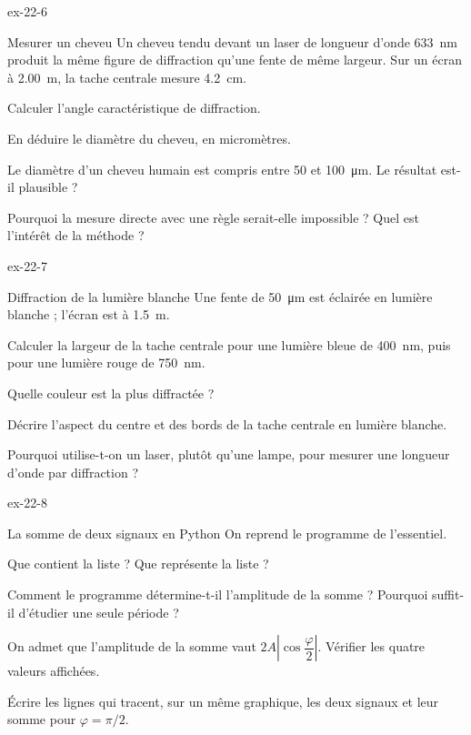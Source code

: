 \begin{blocLivre}{ex-22-6}
\begin{exercice}[2]{Mesurer un cheveu}
Un cheveu tendu devant un laser de longueur d'onde \qty{633}{nm} produit la même figure de diffraction qu'une fente de même
largeur. Sur un écran à \qty{2,00}{m}, la tache centrale mesure \qty{4,2}{cm}.
\begin{questions}
\item Calculer l'angle caractéristique de diffraction.
\item En déduire le diamètre du cheveu, en micromètres.
\item Le diamètre d'un cheveu humain est compris entre 50 et \qty{100}{\micro m}. Le résultat est-il plausible ?
\item Pourquoi la mesure directe avec une règle serait-elle impossible ? Quel est l'intérêt de la méthode ?
\end{questions}
\end{exercice}
\end{blocLivre}
\begin{blocLivre}{ex-22-7}
\begin{exercice}[2]{Diffraction de la lumière blanche}
Une fente de \qty{50}{\micro m} est éclairée en lumière blanche ; l'écran est à \qty{1,5}{m}.
\begin{questions}
\item Calculer la largeur de la tache centrale pour une lumière bleue de \qty{400}{nm}, puis pour une lumière rouge de
\qty{750}{nm}.
\item Quelle couleur est la plus diffractée ?
\item Décrire l'aspect du centre et des bords de la tache centrale en lumière blanche.
\item Pourquoi utilise-t-on un laser, plutôt qu'une lampe, pour mesurer une longueur d'onde par diffraction ?
\end{questions}
\end{exercice}
\end{blocLivre}
\begin{blocLivre}{ex-22-8}
\begin{exercice}[2]{La somme de deux signaux en Python}
On reprend le programme de l'essentiel.
\begin{questions}
\item {}Que contient la liste  ? Que représente la liste  ?
\item Comment le programme détermine-t-il l'amplitude de la somme ? Pourquoi suffit-il d'étudier une seule période ?
\item On admet que l'amplitude de la somme vaut $2A\left|\cos\dfrac{\varphi}{2}\right|$. Vérifier les quatre valeurs affichées.
\item Écrire les lignes qui tracent, sur un même graphique, les deux signaux et leur somme pour $\varphi=\pi/2$.
\end{questions}
\end{exercice}
\end{blocLivre}
